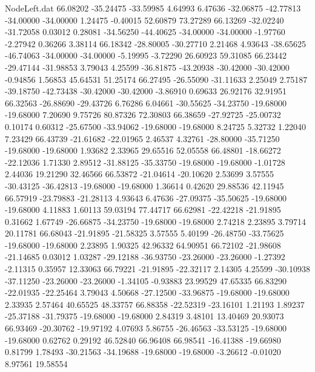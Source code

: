 \begin{filecontents}{NodeLeft.dat}
  66.08202  -35.24475  -33.59985     4.64993    6.47636  -32.06875  -42.77813  -34.00000  -34.00000    1.24475   -0.40015   52.60879   73.27289
  66.13269  -32.02240  -31.72058     0.03012    0.28081  -34.56250  -44.40625  -34.00000  -34.00000   -1.97760   -2.27942    0.36266    3.38114
  66.18342  -28.80005  -30.27710     2.21468    4.93643  -38.65625  -46.74063  -34.00000  -34.00000   -5.19995   -3.72290   26.60923   59.31085
  66.23442  -29.47144  -31.98853     3.79043    4.25599  -36.81875  -43.20938  -30.42000  -30.42000   -0.94856    1.56853   45.64531   51.25174
  66.27495  -26.55090  -31.11633     2.25049    2.75187  -39.18750  -42.73438  -30.42000  -30.42000   -3.86910    0.69633   26.92176   32.91951
  66.32563  -26.88690  -29.43726     6.76286    6.04661  -30.55625  -34.23750  -19.68000  -19.68000    7.20690    9.75726   80.87326   72.30803
  66.38659  -27.92725  -25.00732     0.10174    0.60312  -25.67500  -33.94062  -19.68000  -19.68000    8.24725    5.32732    1.22040    7.23429
  66.43739  -21.61682  -22.01965     2.46537    4.32761  -28.80000  -35.71250  -19.68000  -19.68000    1.93682    2.33965   29.65516   52.05558
  66.48801  -18.66272  -22.12036     1.71330    2.89512  -31.88125  -35.33750  -19.68000  -19.68000   -1.01728    2.44036   19.21290   32.46566
  66.53872  -21.04614  -20.10620     2.53699    3.57555  -30.43125  -36.42813  -19.68000  -19.68000    1.36614    0.42620   29.88536   42.11945
  66.57919  -23.79883  -21.28113     4.93643    6.47636  -27.09375  -35.50625  -19.68000  -19.68000    4.11883    1.60113   59.03194   77.44717
  66.62981  -22.42218  -21.91895     0.31662    1.67749  -26.66875  -34.23750  -19.68000  -19.68000    2.74218    2.23895    3.79714   20.11781
  66.68043  -21.91895  -21.58325     3.57555    5.40199  -26.48750  -33.75625  -19.68000  -19.68000    2.23895    1.90325   42.96332   64.90951
  66.72102  -21.98608  -21.14685     0.03012    1.03287  -29.12188  -36.93750  -23.26000  -23.26000   -1.27392   -2.11315    0.35957   12.33063
  66.79221  -21.91895  -22.32117     2.14305    4.25599  -30.10938  -37.11250  -23.26000  -23.26000   -1.34105   -0.93883   23.99529   47.65335
  66.83290  -22.01935  -22.25464     3.79043    4.50668  -27.12500  -33.96875  -19.68000  -19.68000    2.33935    2.57464   40.65525   48.33757
  66.88358  -22.52319  -23.16101     1.21193    1.89237  -25.37188  -31.79375  -19.68000  -19.68000    2.84319    3.48101   13.40469   20.93073
  66.93469  -20.30762  -19.97192     4.07693    5.86755  -26.46563  -33.53125  -19.68000  -19.68000    0.62762    0.29192   46.52840   66.96408
  66.98541  -16.41388  -19.66980     0.81799    1.78493  -30.21563  -34.19688  -19.68000  -19.68000   -3.26612   -0.01020    8.97561   19.58554

\end{filecontents}
